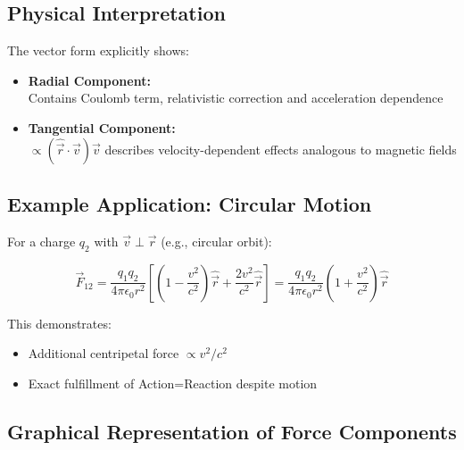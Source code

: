 \subsection{Physical Interpretation}
The vector form explicitly shows:
\begin{itemize}
\item \textbf{Radial Component:}\\Contains Coulomb term, relativistic correction and acceleration dependence
\item \textbf{Tangential Component:}\\$\propto (\hat{\vec{r}}\cdot\vec{v})\vec{v}$ describes velocity-dependent effects analogous to magnetic fields
\end{itemize}

\subsection{Example Application: Circular Motion}
For a charge $q_2$ with $\vec{v} \perp \vec{r}$ (e.g., circular orbit):

\begin{equation}
\vec{F}_{12} = \frac{q_1 q_2}{4\pi\epsilon_0 r^2} \left[
\left(1 - \frac{v^2}{c^2}\right)\hat{\vec{r}} + \frac{2v^2}{c^2}\hat{\vec{r}}
\right] = \frac{q_1 q_2}{4\pi\epsilon_0 r^2} \left(1 + \frac{v^2}{c^2}\right)\hat{\vec{r}}
\end{equation}

This demonstrates:
\begin{itemize}
\item Additional centripetal force $\propto v^2/c^2$
\item Exact fulfillment of Action=Reaction despite motion
\end{itemize}

\subsection{Graphical Representation of Force Components}

